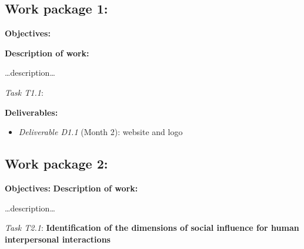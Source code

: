 \documentclass[11pt,a4paper]{report}
\newcommand{\task}[2]{\vspace{0.5cm}\noindent\emph{Task T#1}: {\bf #2}\par}
\begin{document}
\subsection{Work package 1: \wpOne}



\textbf{Objectives:}

\textbf{Description of work:}

\ldots{}description\ldots{}

\task{1.1}{}

\vspace{0.5cm}\textbf{Deliverables:}

\begin{itemize}

\item   \emph{Deliverable D1.1} (Month 2): website and logo
\end{itemize}

\subsection{Work package 2: \wpTwo}

\textbf{Objectives:}
\textbf{Description of work:}

\ldots{}description\ldots{}

\task{2.1}{Identification of the dimensions of social influence for human interpersonal interactions}
\end{document}
